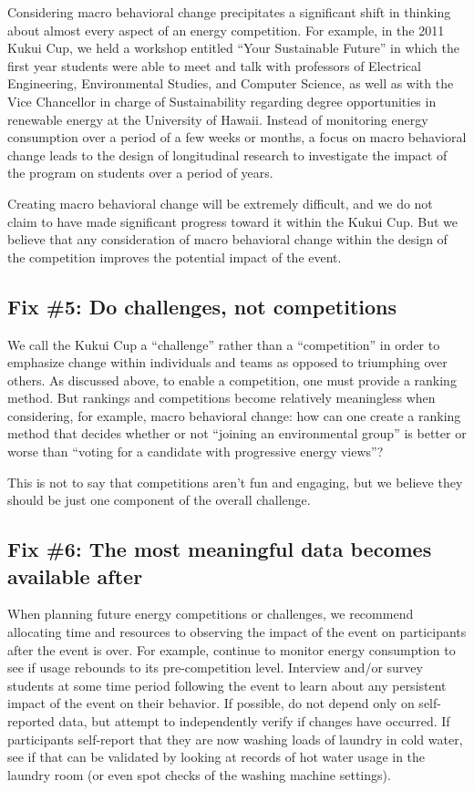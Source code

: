 \documentclass[jou]{apa} %
\begin{document}
Considering macro behavioral change precipitates a significant shift in thinking about
almost every aspect of an energy competition.  For example, in the 2011 Kukui Cup, we held
a workshop entitled ``Your Sustainable Future'' in which the first year students were able
to meet and talk with professors of Electrical Engineering, Environmental Studies, and
Computer Science, as well as with the Vice Chancellor in charge of Sustainability
regarding degree opportunities in renewable energy at the University of Hawaii.  Instead
of monitoring energy consumption over a period of a few weeks or months, a focus on macro
behavioral change leads to the design of longitudinal research to investigate the impact
of the program on students over a period of years.

Creating macro behavioral change will be extremely difficult, and we do not claim to have
made significant progress toward it within the Kukui Cup.  But we believe that any
consideration of macro behavioral change within the design of the competition improves the
potential impact of the event.

\subsection{Fix \#5: Do challenges, not competitions}

We call the Kukui Cup a ``challenge'' rather than a ``competition'' in order to emphasize
change within individuals and teams as opposed to triumphing over others.  As discussed
above, to enable a competition, one must provide a ranking method.  But rankings and
competitions become relatively meaningless when considering, for example, macro behavioral
change: how can one create a ranking method that decides whether or not ``joining an
environmental group'' is better or worse than ``voting for a candidate with progressive
energy views''?

This is not to say that competitions aren't fun and engaging, but we believe they should
be just one component of the overall challenge.  

\subsection{Fix \#6: The most meaningful data becomes available after}

When planning future energy competitions or challenges, we recommend allocating time and
resources to observing the impact of the event on participants after the event is over.
For example, continue to monitor energy consumption to see if usage rebounds to its
pre-competition level.  Interview and/or survey students at some time period following the
event to learn about any persistent impact of the event on their behavior.  If possible,
do not depend only on self-reported data, but attempt to independently verify if changes
have occurred.  If participants self-report that they are now washing loads of laundry in
cold water,  see if that can be validated by looking at records of hot water usage in the
laundry room (or even spot checks of the washing machine settings). 
\end{document}

